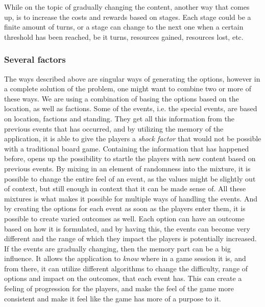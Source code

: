 While on the topic of gradually changing the content, another way that comes up, is to increase the costs and rewards based on stages.
Each stage could be a finite amount of turns, or a stage can change to the next one when a certain threshold has been reached, be it turns, resources gained, resources lost, etc.

\subsubsection{Several factors}
The ways described above are singular ways of generating the options, however in a complete solution of the problem, one might want to combine two or more of these ways. 
We are using a combination of basing the options based on the location, as well as factions. Some of the events, i.e. the special events, are based on location, factions and standing. They get all this information from the previous events that has occurred, and by utilizing the memory of the application, it is able to give the players a \textit{shock factor} that would not be possible with a traditional board game. Containing the information that has happened before, opens up the possibility to startle the players with new content based on previous events. 
By mixing in an element of randomness into the mixture, it is possible to change the entire feel of an event, as the values might be slightly out of context, but still enough in context that it can be made sense of. All these mixtures is what makes it possible for multiple ways of handling the events. And by creating the options for each event as soon as the players enter them, it is possible to create varied outcomes as well. Each option can have an outcome based on how it is formulated, and by having this, the events can become very different and the range of which they impact the players is potentially increased. 
If the events are gradually changing, then the memory part can be a big influence. It allows the application to \textit{know} where in a game session it is, and from there, it can utilize different algorithms to change the difficulty, range of options and impact on the outcomes, that each event has. This can create a feeling of progression for the players, and make the feel of the game more consistent and make it feel like the game has more of a purpose to it.

